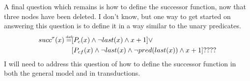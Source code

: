 \documentclass{article}
\newcommand\myeq{\mathrel{\stackrel{\makebox[0pt]{\mbox{\normalfont\tiny def}}}{=}}}
\begin{document}
A final question which remains is how to define the successor function, now that three nodes have been deleted. I don't know, but one way to get started on answering this question is to define it in a way similar to the unary predicates.
\begin{equation}
\begin{aligned}
succ^{\tau}(x)\myeq &[P_{c}(x)\land \neg last(x) \land x+1] \lor \\
&[P_{cf}(x) \land \neg last(x) \land \neg pred(last(x)) \land x+1] ????
\end{aligned}
\end{equation}
I will need to address this question of how to define the successor function in both the general model and in transductions.
\end{document}
